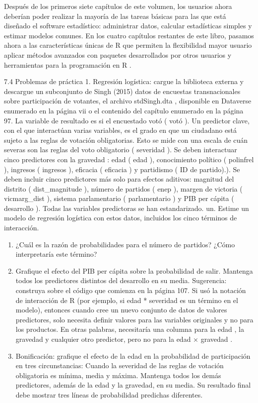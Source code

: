 \documentclass[
]{book}
\begin{document}
Después de los primeros siete capítulos de este volumen, los usuarios ahora deberían poder realizar la mayoría de las tareas básicas para las que está diseñado el software estadístico: administrar datos, calcular estadísticas simples y estimar modelos comunes. En los cuatro capítulos restantes de este libro, pasamos ahora a las características únicas de R que permiten la flexibilidad mayor usuario aplicar métodos avanzados con paquetes desarrollados por otros usuarios y herramientas para la programación en R .

7.4 Problemas de práctica
1.
Regresión logística: cargue la biblioteca externa y descargue un subconjunto de Singh (2015) datos de encuestas transnacionales sobre participación de votantes, el archivo stdSingh.dta , disponible en Dataverse enumerado en la página vii o el contenido del capítulo enumerado en la página 97. La variable de resultado es si el encuestado votó ( votó ). Un predictor clave, con el que interactúan varias variables, es el grado en que un ciudadano está sujeto a las reglas de votación obligatorias. Esto se mide con una escala de cuán severas son las reglas del voto obligatorio ( severidad ). Se deben interactuar cinco predictores con la gravedad : edad ( edad ), conocimiento político ( polinfrel ), ingresos ( ingresos ), eficacia ( eficacia ) y partidismo ( ID de partido).). Se deben incluir cinco predictores más solo para efectos aditivos: magnitud del distrito ( dist\_magnitude ), número de partidos ( enep ), margen de victoria ( vicmarg\_dist ), sistema parlamentario ( parlamentario ) y PIB per cápita ( desarrollo ). Todas las variables predictoras se han estandarizado.
un.
Estime un modelo de regresión logística con estos datos, incluidos los cinco términos de interacción.

\begin{enumerate}
\def\labelenumi{\Alph{enumi}.}
\setcounter{enumi}{1}
\item
  ¿Cuál es la razón de probabilidades para el número de partidos? ¿Cómo interpretaría este término?
\item
  Grafique el efecto del PIB per cápita sobre la probabilidad de salir. Mantenga todos los predictores distintos del desarrollo en su media. Sugerencia: construya sobre el código que comienza en la página 107. Si usó la notación de interacción de R (por ejemplo, si edad * severidad es un término en el modelo), entonces cuando cree un nuevo conjunto de datos de valores predictores, solo necesita definir valores para las variables originales y no para los productos. En otras palabras, necesitaría una columna para la edad , la gravedad y cualquier otro predictor, pero no para la edad × gravedad .
\item
  Bonificación: grafique el efecto de la edad en la probabilidad de participación en tres circunstancias: Cuando la severidad de las reglas de votación obligatoria es mínima, media y máxima. Mantenga todos los demás predictores, además de la edad y la gravedad, en su media. Su resultado final debe mostrar tres líneas de probabilidad predichas diferentes.
\end{enumerate}
\end{document}
